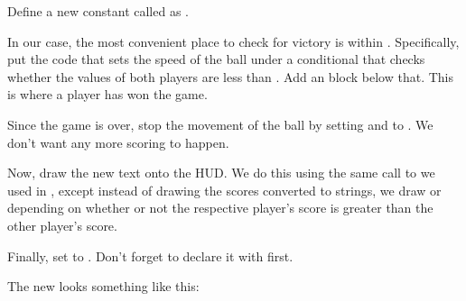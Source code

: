 \documentclass[letterpaper,10pt,english]{sphinxmanual}
\begin{document}
Define a new constant called  as .

In our case, the most convenient place to check for victory is within
.  Specifically, put the code that sets the speed of
the ball under a conditional that checks whether the 
values of both players are less than .  Add an
 block below that.  This is where a player has won the game.

Since the game is over, stop the movement of the ball by setting
 and  to .  We don't want any
more scoring to happen.

Now, draw the new text onto the HUD.  We do this using the same call to
{\hyperref[gfx:sge.gfx.Sprite.draw_text]{\emph{}}} we used in , except
instead of drawing the scores converted to strings, we draw  or
 depending on whether or not the respective player's score is
greater than the other player's score.

Finally, set  to .  Don't forget
to declare it with  first.

The new  looks something like this:
\end{document}
